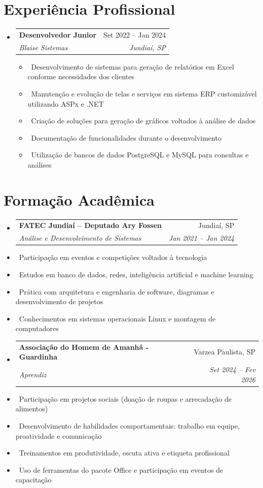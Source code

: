 \documentclass[letterpaper,10pt]{article}
\makeatletter
\newcommand{\resumeItem}[1]{\item\small{#1}}
\newcommand{\resumeSubheading}[4]{
\vspace{-1pt}\item
  \begin{tabular*}{0.97\textwidth}[t]{l@{\extracolsep{\fill}}r}
    \textbf{#1} & #2 \\
    \textit{#3} & \textit{#4} \\
  \end{tabular*}\vspace{-7pt}
}
\newcommand{\resumeSubHeadingList}{\begin{itemize}[leftmargin=0.15in, label={}]}
\newcommand{\resumeSubHeadingListEnd}{\end{itemize}}
\makeatother
\begin{document}
\section{Experiência Profissional}
\resumeSubHeadingList
  \resumeSubheading
      {Desenvolvedor Junior}{Set 2022 -- Jan 2024}
      {Blaise Sistemas}{Jundiaí, SP}
      \resumeSubHeadingList
          \resumeItem{\textbullet\ Desenvolvimento de sistemas para geração de relatórios em Excel conforme necessidades dos clientes}
          \resumeItem{\textbullet\ Manutenção e evolução de telas e serviços em sistema ERP customizável utilizando ASPx e .NET}
          \resumeItem{\textbullet\ Criação de soluções para geração de gráficos voltados à análise de dados}
          \resumeItem{\textbullet\ Documentação de funcionalidades durante o desenvolvimento}
          \resumeItem{\textbullet\ Utilização de bancos de dados PostgreSQL e MySQL para consultas e análises}
      \resumeSubHeadingListEnd
\resumeSubHeadingListEnd

\section{Formação Acadêmica}
\resumeSubHeadingList
  \resumeSubheading
      {FATEC Jundiaí – Deputado Ary Fossen}{Jundiaí, SP}
      {Análise e Desenvolvimento de Sistemas}{Jan 2021 -- Jan 2024}
      \resumeItem{\textbullet\ Participação em eventos e competições voltados à tecnologia}
      \resumeItem{\textbullet\ Estudos em banco de dados, redes, inteligência artificial e machine learning}
      \resumeItem{\textbullet\ Prática com arquitetura e engenharia de software, diagramas e desenvolvimento de projetos}
      \resumeItem{\textbullet\ Conhecimentos em sistemas operacionais Linux e montagem de computadores}
    \resumeSubHeadingListEnd
\resumeSubHeadingList
  \resumeSubheading
      {Associação do Homem de Amanhã - Guardinha}{Varzea Paulista, SP}
      {Aprendiz}{Set 2024 --  Fev 2026}
       \resumeItem{\textbullet\ Participação em projetos sociais (doação de roupas e arrecadação de alimentos)}
       \resumeItem{\textbullet\ Desenvolvimento de habilidades comportamentais: trabalho em equipe, proatividade e comunicação}
       \resumeItem{\textbullet\ Treinamentos em produtividade, escuta ativa e etiqueta profissional}
       \resumeItem{\textbullet\ Uso de ferramentas do pacote Office e participação em eventos de capacitação}
\resumeSubHeadingListEnd
\end{document}
